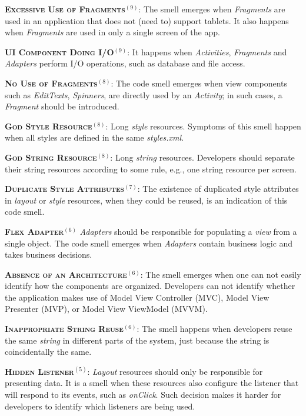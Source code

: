 \noindent
\textsc{\textbf{{\small Excessive Use of Fragments}}}$^{(9)}$: 
The smell emerges when \textit{Fragments} are used in an application
that does not (need to) support tablets. It also happens when \textit{Fragments} are
used in only a single screen of the app.

\noindent
\textsc{\textbf{{\small UI Component Doing I/O}}}$^{(9)}$:
It happens when \textit{Activities}, \textit{Fragments} and \textit{Adapters} perform
I/O operations, such as database and file access.


\noindent
\textsc{\textbf{{\small No Use of Fragments}}}$^{(8)}$: 
The code smell emerges when view components such as 
\textit{EditTexts}, \textit{Spinners}, are directly used by an \textit{Activity};
in such cases, a \textit{Fragment} should be introduced.


\noindent
\textbf{\textsc{{\small God Style Resource}}}$^{(8)}$:
Long \textit{style} resources. Symptoms of this smell happen when
all styles are defined in the same \textit{styles.xml}.

\noindent
\textbf{\textsc{{\small God String Resource}}}$^{(8)}$:
Long \textit{string} resources. Developers should separate their string
resources according to some rule, e.g., one string resource per screen.

\noindent
\textbf{\textsc{{\small Duplicate Style Attributes}}}$^{(7)}$:
The existence of duplicated style attributes in \textit{layout} or
\textit{style} resources, when they could be reused, is an indication
of this code smell.

\noindent
\textsc{\textbf{{\small Flex Adapter}}}$^{(6)}$ \textit{Adapters} 
should be responsible for populating a \textit{view} from a single object.
The code smell emerges when \textit{Adapters} contain
business logic and takes business decisions. 


\noindent
\textsc{\textbf{{\small Absence of an Architecture}}}$^{(6)}$: 
The smell emerges when one can not easily identify how the components
are organized. Developers can not identify whether the application
makes use of Model View Controller (MVC), Model View Presenter (MVP),
or Model View ViewModel (MVVM).


\noindent
\textbf{\textsc{{\small Inappropriate String Reuse}}}$^{(6)}$:
The smell happens when developers reuse the same \textit{string} in different
parts of the system, just because the string is coincidentally the same.


\noindent
\textbf{\textsc{{\small Hidden Listener}}}$^{(5)}$:
\textit{Layout} resources should only be responsible for presenting data.
It is a smell when these resources also configure the listener that
will respond to its events, such as \textit{onClick}. Such decision
makes it harder for developers to identify which listeners are being used.

